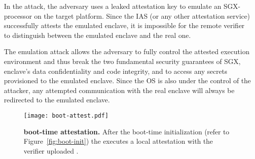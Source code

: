 In the attack, the adversary uses a leaked attestation key to emulate an SGX-processor on the target platform. 
Since the IAS (or any other attestation service) successfully attests the emulated enclave, it is impossible for the remote verifier to distinguish between the emulated enclave and the real one. 


 The emulation attack allows the adversary to fully control the attested execution environment and thus break the two fundamental security guarantees of SGX, enclave's data confidentiality and code integrity, and to access any secrets provisioned to the emulated enclave. Since the OS is also under the control of the attacker, any attempted communication with the real enclave will always be redirected to the emulated enclave.




\begin{figure}[t]
 \centering
\texttt{[image: boot-attest.pdf]}
 \caption{\textbf{\name boot-time attestation.} After the boot-time initialization (refer to Figure~\ref{fig:boot-init}) the \nameclave executes a local attestation with the verifier uploaded \app. 
 }
\figsaver
 \label{fig:boot-attest}
\end{figure}



